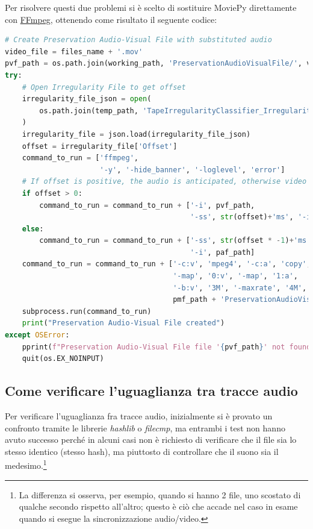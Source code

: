 Per risolvere questi due problemi si è scelto di sostituire MoviePy direttamente con \href{https://ffmpeg.org/}{FFmpeg}, ottenendo come risultato il seguente codice:
\begin{lstlisting}[language=Python, caption={Codice finale, creazione Preservation Audio-Visual File (Packager)}]
# Create Preservation Audio-Visual File with substituted audio
video_file = files_name + '.mov'
pvf_path = os.path.join(working_path, 'PreservationAudioVisualFile/', video_file)
try:
    # Open Irregularity File to get offset
    irregularity_file_json = open(
        os.path.join(temp_path, 'TapeIrregularityClassifier_IrregularityFileOutput2.json')
    )
    irregularity_file = json.load(irregularity_file_json)
    offset = irregularity_file['Offset']
    command_to_run = ['ffmpeg',
                      '-y', '-hide_banner', '-loglevel', 'error']
    # If offset is positive, the audio is anticipated, otherwise video is anticipated (through seek)
    if offset > 0:
        command_to_run = command_to_run + ['-i', pvf_path,
                                           '-ss', str(offset)+'ms', '-i', paf_path]
    else:
        command_to_run = command_to_run + ['-ss', str(offset * -1)+'ms', '-i', pvf_path,
                                           '-i', paf_path]
    command_to_run = command_to_run + ['-c:v', 'mpeg4', '-c:a', 'copy',
                                       '-map', '0:v', '-map', '1:a',
                                       '-b:v', '3M', '-maxrate', '4M', '-bufsize', '4M',
                                       pmf_path + 'PreservationAudioVisualFile.mov']
    subprocess.run(command_to_run)
    print("Preservation Audio-Visual File created")
except OSError:
    pprint(f"Preservation Audio-Visual File file '{pvf_path}' not found!", color=Color.RED)
    quit(os.EX_NOINPUT)
\end{lstlisting}


\subsection{Come verificare l'uguaglianza tra tracce audio} \label{ssec:packager-audio}    %
Per verificare l'uguaglianza fra tracce audio, inizialmente si è provato un confronto tramite le librerie \textit{hashlib} o \textit{filecmp}, ma entrambi i test non hanno avuto successo perché in alcuni casi non è richiesto di verificare che il file sia lo stesso identico (stesso hash), ma piuttosto di controllare che il suono sia il medesimo.\footnote{La differenza si osserva, per esempio, quando si hanno 2 file, uno scostato di qualche secondo rispetto all'altro; questo è ciò che accade nel caso in esame quando si esegue la sincronizzazione audio/video.}

